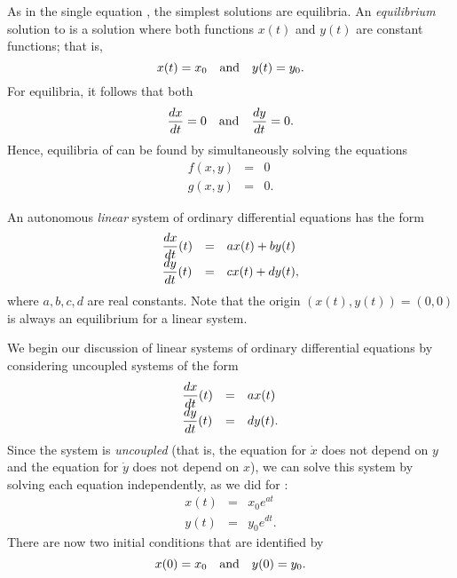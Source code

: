 As in the single equation , the simplest
solutions are equilibria.  An {\em equilibrium\/} 
solution to
 is a solution where both functions $x(t)$
and $y(t)$ are constant functions; that is,
\[
x(t) = x_0 \quad\mbox{and}\quad  y(t)=y_0.
\]
For equilibria, it follows that both
\[
\frac{dx}{dt} = 0 \quad\mbox{and}\quad \frac{dy}{dt} = 0.
\]
Hence, equilibria of  can be found by
simultaneously solving the equations
\begin{eqnarray*}
f(x,y) & = & 0 \\
g(x,y) & = & 0.
\end{eqnarray*}

An autonomous {\em linear\/} system  of ordinary
differential equations 
has the form
\renewcommand{\arraystretch}{1.8}
\begin{equation} \label{e:autlin}
\begin{array}{lll}
\displaystyle \frac{dx}{dt}(t)  & = & a x(t) + b y(t) \\
\displaystyle \frac{dy}{dt}(t)  & = & c x(t) + d y(t),
\end{array}
\end{equation}
\renewcommand{\arraystretch}{1.0}%
where $a,b,c,d$ are real constants.  Note that the origin
$(x(t),y(t))=(0,0)$ is always an equilibrium for a linear
system.

We begin our discussion of linear systems of ordinary
differential equations by considering uncoupled
systems of the form
\renewcommand{\arraystretch}{1.8}
\begin{equation} \label{lin2}
\begin{array}{lll}
\displaystyle \frac{dx}{dt}(t) & = & a x(t) \\
\displaystyle \frac{dy}{dt}(t) & = & d y(t).
\end{array}
\end{equation}
\renewcommand{\arraystretch}{1.0}%
Since the system is {\em uncoupled\/} (that is, the equation for
$\dot{x}$ does not depend on $y$ and the equation for $\dot{y}$
does not depend on $x$), we can solve this system by solving each
equation independently, as we did for :
\begin{equation} \label{e:explicitsoln}
\begin{array}{ccc}
x(t) & = & x_0e^{at} \\
y(t) & = & y_0e^{dt}.
\end{array}
\end{equation}
There are now two initial conditions that are identified by
\[
x(0) = x_0 \quad\mbox{and}\quad y(0) = y_0.
\]

